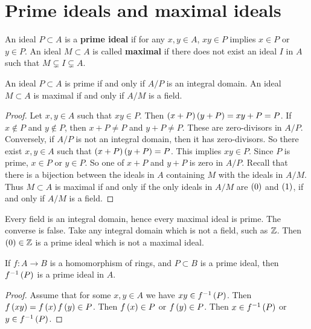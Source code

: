 \pagebreak

\section{Prime ideals and maximal ideals}

\begin{definition}
An ideal $ P \subset A $ is a \textbf{prime ideal} if for any $ x, y \in A $, $ xy \in P $ implies $ x \in P $ or $ y \in P $. An ideal $ M \subset A $ is called \textbf{maximal} if there does not exist an ideal $ I $ in $ A $ such that $ M \subsetneq I \subsetneq A $.
\end{definition}

\begin{lemma}
An ideal $ P \subset A $ is prime if and only if $ A / P $ is an integral domain. An ideal $ M \subset A $ is maximal if and only if $ A / M $ is a field.
\end{lemma}

\begin{proof}
Let $ x, y \in A $ such that $ xy \in P $. Then $ \left( x + P \right)\left( y + P \right) = xy + P = P $. If $ x \notin P $ and $ y \notin P $, then $ x + P \ne P $ and $ y + P \ne P $. These are zero-divisors in $ A / P $. Conversely, if $ A / P $ is not an integral domain, then it has zero-divisors. So there exist $ x, y \in A $ such that $ \left( x + P \right)\left( y + P \right) = P $. This implies $ xy \in P $. Since $ P $ is prime, $ x \in P $ or $ y \in P $. So one of $ x + P $ and $ y + P $ is zero in $ A / P $. Recall that there is a bijection between the ideals in $ A $ containing $ M $ with the ideals in $ A / M $. Thus $ M \subset A $ is maximal if and only if the only ideals in $ A / M $ are $ \left( 0 \right) $ and $ \left( 1 \right) $, if and only if $ A / M $ is a field.
\end{proof}

\begin{remark}
Every field is an integral domain, hence every maximal ideal is prime. The converse is false. Take any integral domain which is not a field, such as $ \mathbb{Z} $. Then $ \left( 0 \right) \in \mathbb{Z} $ is a prime ideal which is not a maximal ideal.
\end{remark}

\begin{proposition}
If $ f : A \to B $ is a homomorphism of rings, and $ P \subset B $ is a prime ideal, then $ f^{-1}\left( P \right) $ is a prime ideal in $ A $.
\end{proposition}

\begin{proof}
Assume that for some $ x, y \in A $ we have $ xy \in f^{-1}\left( P \right) $. Then $ f\left( xy \right) = f\left( x \right)f\left( y \right) \in P $. Then $ f\left( x \right) \in P $ or $ f\left( y \right) \in P $. Then $ x \in f^{-1}\left( P \right) $ or $ y \in f^{-1}\left( P \right) $.
\end{proof}

